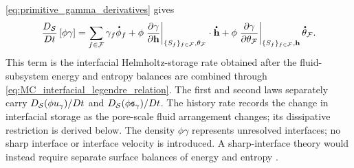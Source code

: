 \eqref{eq:primitive_gamma_derivatives} gives
%
\begin{equation}
	\frac{D_{\mc S}}{Dt}
	\left[
		\phi\gamma
		\right]
	=
	\sum_{f\in\mc F}
	\gamma_f\phasedot\phi_f
	+
	\phi
	\left.
	\p{\gamma}{\mbf h}
	\right\vert_{\{S_f\}_{f\in\mc F},\theta_{\mc F}}
	\cdot\phasedot{\mbf h}
	+
	\phi
	\left.
	\p{\gamma}{\theta_{\mc F}}
	\right\vert_{\{S_f\}_{f\in\mc F},\mbf h}
	\phasedot\theta_{\mc F} .
	\label{eq:MC_interfacial_helmholtz_rate}
\end{equation}
%
This term is the interfacial Helmholtz-storage rate obtained after the
fluid-subsystem energy and entropy balances are combined through
\eqref{eq:MC_interfacial_legendre_relation}.  The first and second laws
separately carry \(D_{\mathcal{S}}(\phi u_\gamma)/Dt\) and
\(D_{\mathcal{S}}(\phi\mathfrak{s}_\gamma)/Dt\).  The
history rate records the change in interfacial storage as the pore-scale fluid
arrangement changes; its dissipative restriction is derived below.  The density
\(\phi\gamma\) represents unresolved interfaces; no sharp interface or
interface velocity is introduced.  A
sharp-interface theory would instead require separate surface balances of
energy and entropy
\cite{dreyer2018bulk_surface_electrothermodynamics,bothe2022sharp_interface}.

